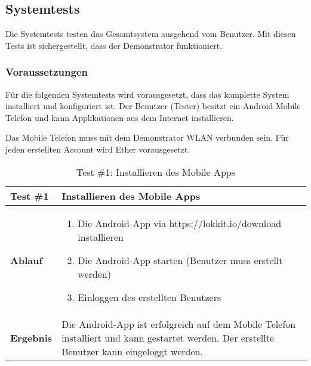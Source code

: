 \subsection{Systemtests}
Die Systemtests testen das Gesamtsystem ausgehend vom Benutzer. Mit diesen Tests ist sichergestellt, dass der Demonstrator funktioniert.

\subsubsection{Voraussetzungen}
Für die folgenden Systemtests wird vorausgesetzt, dass das komplette System installiert und konfiguriert ist. Der Benutzer (Tester) besitzt ein Android Mobile Telefon und kann Applikationen aus dem Internet installieren.

Das Mobile Telefon muss mit dem Demonstrator WLAN verbunden sein.
Für jeden erstellten Account wird Ether vorausgesetzt.


\begin{table}[H]
\centering
\caption{Test \#1: Installieren des Mobile Apps}
\label{my-label}
\begin{tabular}{@{}L{1.6cm}L{11cm}@{}}
\toprule
\textbf{Test \#1}
& Installieren des Mobile Apps
\\ \midrule
\textbf{Ablauf}
& 
\begin{enumerate}
    \item Die Android-App via https://lokkit.io/download installieren
    \item Die Android-App starten (Benutzer muss erstellt werden)
    \item Einloggen des erstellten Benutzers
\end{enumerate}
\\ \midrule
\textbf{Ergebnis}
& Die Android-App ist erfolgreich auf dem Mobile Telefon installiert und kann gestartet werden. Der erstellte Benutzer kann eingeloggt werden.
\\ \bottomrule
\end{tabular}
\end{table}



